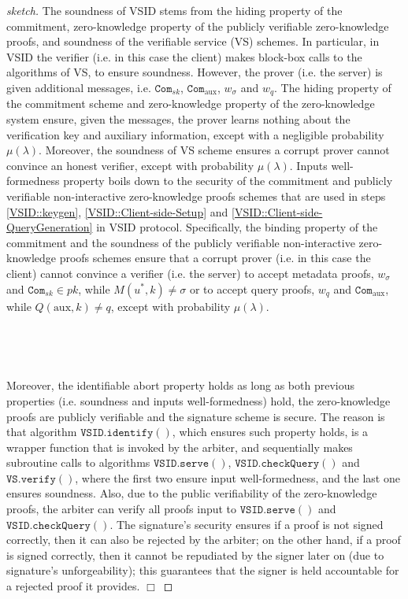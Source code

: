 
\begin{proof}[sketch] The soundness  of VSID  stems  from the hiding property of the commitment, zero-knowledge property of the publicly verifiable zero-knowledge proofs, and soundness of  the  verifiable service (VS) schemes. In particular, in VSID the verifier (i.e. in this case the client) makes block-box calls to the algorithms of   VS, to ensure soundness. However, the prover (i.e.  the server) is given  additional messages, i.e.   $\mathtt{Com}_{\scriptscriptstyle sk}$,  $\mathtt{Com}_{\scriptscriptstyle \text{aux}}$, $w_{\scriptscriptstyle\sigma}$ and $w_{\scriptscriptstyle q}$. The hiding property of the commitment scheme and zero-knowledge property of the zero-knowledge system ensure, given the messages, the prover learns nothing about the verification key and auxiliary information, except with a negligible probability $\mu(\lambda)$. Moreover, the soundness of VS scheme ensures a corrupt prover cannot convince an honest verifier, except with  probability $\mu(\lambda)$.   Inputs well-formedness property boils down to the security of the commitment and publicly verifiable non-interactive zero-knowledge proofs   schemes that are used in steps \ref{VSID::keygen}, \ref{VSID::Client-side-Setup} and \ref{VSID::Client-side-QueryGeneration} in VSID protocol. Specifically,  the binding property of the commitment and the soundness of the publicly verifiable non-interactive zero-knowledge proofs schemes  ensure that a corrupt prover (i.e. in this case the client) cannot convince a verifier (i.e. the server) to accept metadata proofs, $w_{\scriptscriptstyle\sigma}$ and $\mathtt{Com}_{\scriptscriptstyle sk}\in pk$, while  $M(u^{\scriptscriptstyle *},k)\neq \sigma $ or to accept query proofs, $w_{\scriptscriptstyle q}$ and $\mathtt{Com}_{\scriptscriptstyle \text{aux}}$, while $Q(\text{aux},k)\neq q$, except with  probability $\mu(\lambda)$. 

\

\

Moreover, the identifiable abort property holds as long as both previous properties (i.e. soundness and inputs well-formedness) hold, the zero-knowledge proofs are publicly verifiable and the signature scheme is secure. The reason is that algorithm $\mathtt{VSID.identify}()$, which  ensures such property  holds,  is a wrapper function that is invoked by the arbiter, and  sequentially makes subroutine calls to algorithms  $\mathtt{VSID.serve}()$,  $\mathtt{VSID.checkQuery}()$ and $\mathtt{VS.verify}()$,   where the first two ensure input well-formedness, and the last one ensures soundness. Also, due to the public verifiability of the zero-knowledge proofs, the arbiter can verify all proofs input to   $\mathtt{VSID.serve}()$ and $\mathtt{VSID.checkQuery}()$. The signature's security ensures if a proof is not signed correctly, then it can also be rejected by the arbiter; on the other hand, if a proof is signed correctly, then  it cannot be repudiated by the signer later on (due to signature's unforgeability); this guarantees that the signer is held accountable for a rejected proof it provides.  \hfill\(\Box\)\end{proof}
  
  
  
  
  
  